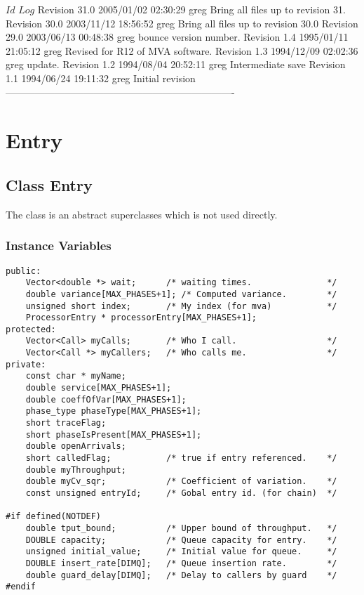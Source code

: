 \C 
\C $Id$
\C 
\C $Log$
\C Revision 31.0  2005/01/02 02:30:29  greg
\C Bring all files up to revision 31.
\C
\C Revision 30.0  2003/11/12 18:56:52  greg
\C Bring all files up to revision 30.0
\C
\C Revision 29.0  2003/06/13 00:48:38  greg
\C bounce version number.
\C
\C Revision 1.4  1995/01/11 21:05:12  greg
\C Revised for R12 of MVA software.
\C
\C Revision 1.3  1994/12/09  02:02:36  greg
\C update.
\C
\C Revision 1.2  1994/08/04  20:52:11  greg
\C Intermediate save
\C
\C Revision 1.1  1994/06/24  19:11:32  greg
\C Initial revision
\C
\C ----------------------------------------------------------------------
\section{Entry}
\label{sec:entry}

\htmlrule
\subsection{Class Entry}

The class  is an abstract superclasses which is not used
directly.

\subsubsection{Instance Variables}
\label{sec:entry-ivars}

\begin{verbatim}
public:
    Vector<double *> wait;      /* waiting times.               */
    double variance[MAX_PHASES+1]; /* Computed variance.        */
    unsigned short index;       /* My index (for mva)           */
    ProcessorEntry * processorEntry[MAX_PHASES+1];
protected:
    Vector<Call> myCalls;       /* Who I call.                  */
    Vector<Call *> myCallers;   /* Who calls me.                */
private:
    const char * myName;
    double service[MAX_PHASES+1];
    double coeffOfVar[MAX_PHASES+1];
    phase_type phaseType[MAX_PHASES+1];
    short traceFlag;
    short phaseIsPresent[MAX_PHASES+1];
    double openArrivals;
    short calledFlag;           /* true if entry referenced.    */
    double myThroughput;
    double myCv_sqr;            /* Coefficient of variation.    */
    const unsigned entryId;     /* Gobal entry id. (for chain)  */

#if defined(NOTDEF)
    double tput_bound;          /* Upper bound of throughput.   */
    DOUBLE capacity;            /* Queue capacity for entry.    */
    unsigned initial_value;     /* Initial value for queue.     */
    DOUBLE insert_rate[DIMQ];   /* Queue insertion rate.        */
    double guard_delay[DIMQ];   /* Delay to callers by guard    */
#endif
\end{verbatim}

